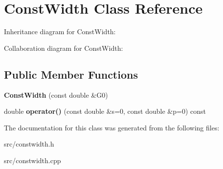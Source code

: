 \hypertarget{class_const_width}{}\section{Const\+Width Class Reference}
\label{class_const_width}


Inheritance diagram for Const\+Width\+:


Collaboration diagram for Const\+Width\+:
\subsection*{Public Member Functions}
\begin{DoxyCompactItemize}
\item 
\hypertarget{class_const_width_a81e01f4bee6dbbd40b22a935b38fa7ba}{}{\bfseries Const\+Width} (const double \&G0)\label{class_const_width_a81e01f4bee6dbbd40b22a935b38fa7ba}

\item 
\hypertarget{class_const_width_a0accd07758b0c36309f7f7ea845117fe}{}double {\bfseries operator()} (const double \&s=0, const double \&p=0) const \label{class_const_width_a0accd07758b0c36309f7f7ea845117fe}

\end{DoxyCompactItemize}


The documentation for this class was generated from the following files\+:\begin{DoxyCompactItemize}
\item 
src/constwidth.\+h\item 
src/constwidth.\+cpp\end{DoxyCompactItemize}
